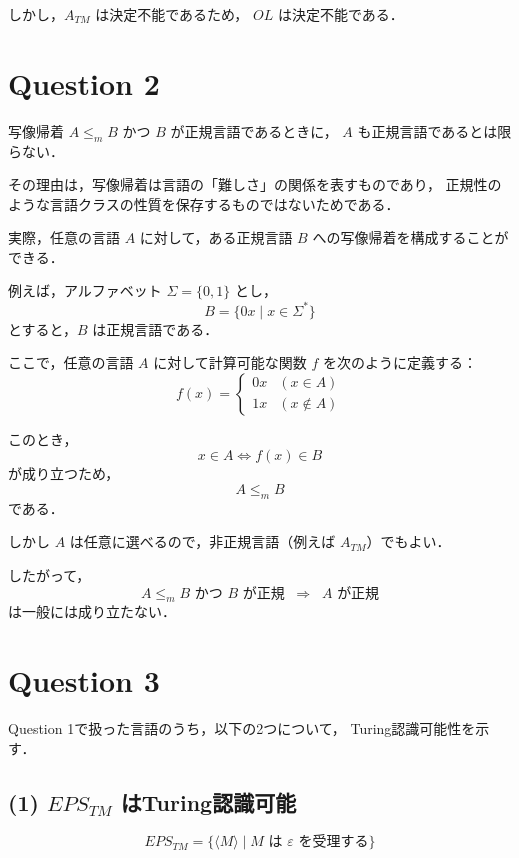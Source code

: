 \documentclass[a4paper,11pt]{ltjsarticle}
\begin{document}
しかし，$A_{TM}$ は決定不能であるため，
$OL$ は決定不能である．

\section*{Question 2}

写像帰着 $A \leq_m B$ かつ $B$ が正規言語であるときに，
$A$ も正規言語であるとは限らない．

その理由は，写像帰着は言語の「難しさ」の関係を表すものであり，
正規性のような言語クラスの性質を保存するものではないためである．

実際，任意の言語 $A$ に対して，ある正規言語 $B$ への写像帰着を構成することができる．

例えば，アルファベット $\Sigma = \{0,1\}$ とし，
\[
B = \{0x \mid x \in \Sigma^* \}
\]
とすると，$B$ は正規言語である．

ここで，任意の言語 $A$ に対して計算可能な関数 $f$ を次のように定義する：
\[
f(x) =
\begin{cases}
0x & (x \in A) \\
1x & (x \notin A)
\end{cases}
\]

このとき，
\[
x \in A \iff f(x) \in B
\]
が成り立つため，
\[
A \leq_m B
\]
である．

しかし $A$ は任意に選べるので，非正規言語（例えば $A_{TM}$）でもよい．

したがって，
\[
A \leq_m B \text{ かつ } B \text{ が正規} \;\;\Rightarrow\;\; A \text{ が正規}
\]
は一般には成り立たない．

\section*{Question 3}

Question 1で扱った言語のうち，以下の2つについて，
Turing認識可能性を示す．

\subsection*{(1) $EPS_{TM}$ はTuring認識可能}

\[
EPS_{TM} = \{ \langle M \rangle \mid M \text{ は } \varepsilon \text{ を受理する} \}
\]
\end{document}
